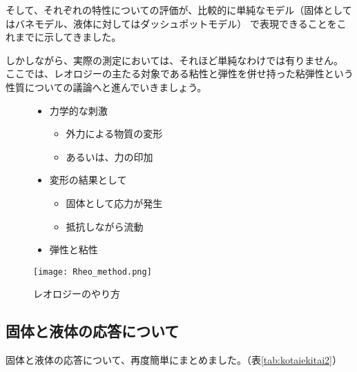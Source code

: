 \documentclass[uplatex,dvipdfmx,a4paper,11pt]{jsarticle}
\begin{document}
そして、それぞれの特性についての評価が、比較的に単純なモデル（固体としてはバネモデル、液体に対してはダッシュポットモデル）
で表現できることをこれまでに示してきました。

しかしながら、実際の測定においては、それほど単純なわけでは有りません。
ここでは、レオロジーの主たる対象である粘性と弾性を併せ持った粘弾性という性質についての議論へと進んでいきましょう。
\begin{figure}[htb]
	\begin{center}
		\begin{minipage}{0.4\textwidth}
			\begin{itemize}
				\item 力学的な刺激
				\begin{itemize}
					\item 外力による物質の変形
					\item あるいは、力の印加
				\end{itemize}
				\item 変形の結果として
				\begin{itemize}
					\item 固体として応力が発生
					\item 抵抗しながら流動
				\end{itemize}
				\item 弾性と粘性
			\end{itemize}
		\end{minipage}
		\begin{minipage}{0.5\textwidth}
			\begin{center}
			\texttt{[image: Rheo\_method.png]}
			\end{center}
		\end{minipage}
		\caption{レオロジーのやり方}
	\end{center}
\end{figure}

\subsection{固体と液体の応答について}

固体と液体の応答について、再度簡単にまとめました。（表\ref{tab:kotaiekitai2}）
\end{document}
